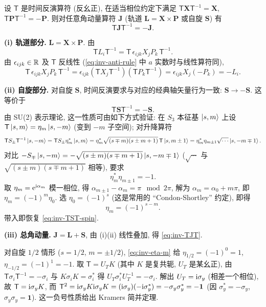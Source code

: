 \begin{proposition}\label{prop:inv-TST}
设 $\mathsf{T}$ 是时间反演算符 (反幺正), 在适当相位约定下满足 $\mathsf{T}\mathbf{X}\mathsf{T}^{-1}=\mathbf{X}$, $\mathsf{T}\mathbf{P}\mathsf{T}^{-1}=-\mathbf{P}$. 则对任意角动量算符 $\mathbf{J}$ (轨道 $\mathbf{L}=\mathbf{X}\times \mathbf{P}$ 或自旋 $\mathbf{S}$) 有
\begin{equation}\label{eq:inv-TJT}
\mathsf{T}\mathbf{J}\mathsf{T}^{-1}=-\mathbf{J}.
\end{equation}
\end{proposition}

\begin{proof*}
\textbf{(i) 轨道部分.}
$\mathbf{L}=\mathbf{X}\times\mathbf{P}$. 由
\[
\mathsf{T}L_i \mathsf{T}^{-1} = \mathsf{T}\,\epsilon_{ijk}X_j P_k\,\mathsf{T}^{-1}.
\]
由 $\epsilon_{ijk}\in\mathbb{R}$ 及 $\mathsf{T}$ 反线性 (\eqref{eq:inv-anti-rule} 中 $a$ 实数时与线性算符同),
\[
\mathsf{T}\,\epsilon_{ijk}X_j P_k\,\mathsf{T}^{-1}=\epsilon_{ijk}(\mathsf{T}X_j\mathsf{T}^{-1})(\mathsf{T}P_k\mathsf{T}^{-1})=\epsilon_{ijk}X_j(-P_k)=-L_i.
\]

\textbf{(ii) 自旋部分.}
对自旋 $\mathbf{S}$, 时间反演要求与对应的经典轴矢量行为一致: $\mathbf{S}\to -\mathbf{S}$. 这等价于
\begin{equation}\label{eq:inv-TST-spin}
\mathsf{T}\mathbf{S}\mathsf{T}^{-1}=-\mathbf{S}.
\end{equation}
由 SU(2) 表示理论, 这一性质可由如下方式验证: 在 $S_3$ 本征基 $\ket{s,m}$ 上设 $\mathsf{T}\ket{s,m}=\eta_m\ket{s,-m}$ (变到 $-m$ 子空间); 对升降算符
\[
\mathsf{T}S_\pm \mathsf{T}^{-1}\ket{s,-m}=\mathsf{T}S_\pm \eta_m^*\ket{s,m}=\eta_m^*\sqrt{(s\mp m)(s\pm m+1)}\,\mathsf{T}\ket{s,m\pm 1}=\eta_m^*\eta_{m\pm 1}\sqrt{\cdots}\ket{s,-m\mp 1}.
\]
对比 $-S_\mp\ket{s,-m}=-\sqrt{(s\pm m)(s\mp m+1)}\ket{s,-m\mp 1}$ ($\sqrt{\cdots}$ 与 $\sqrt{(s\pm m)(s\mp m+1)}$ 相等), 要求
\[
\eta_m^*\eta_{m\pm 1}=-1.
\]
取 $\eta_m=\mathrm{e}^{\mathrm{i} \alpha_m}$ 模一相位, 得 $\alpha_{m\pm 1}-\alpha_m=\pi \mod 2\pi$, 解为 $\alpha_m=\alpha_0+m\pi$, 即 $\eta_m=(-1)^m \eta_0$. 选 $\eta_0=(-1)^s$ (这是常用的 ``Condon-Shortley'' 约定), 即得
\begin{equation}\label{eq:inv-eta-m}
\eta_m=(-1)^{s-m}.
\end{equation}
带入即恢复 \eqref{eq:inv-TST-spin}.

\textbf{(iii) 总角动量.} $\mathbf{J}=\mathbf{L}+\mathbf{S}$, 由 (i)(ii) 线性叠加, 得 \eqref{eq:inv-TJT}.
\end{proof*}

\begin{remark}
对自旋 $1/2$ 情形 ($s=1/2$, $m=\pm 1/2$), \eqref{eq:inv-eta-m} 给 $\eta_{1/2}=(-1)^0=1$, $\eta_{-1/2}=(-1)^1=-1$. 取 $\mathsf{T}=U_T K$ (其中 $K$ 是复共轭, $U_T$ 是某幺正), 由 $\mathsf{T}\sigma_i\mathsf{T}^{-1}=-\sigma_i$ 与 $K\sigma_i K=\sigma_i^*$ 得 $U_T\sigma_i^* U_T^{-1}=-\sigma_i$. 解出 $U_T=\mathrm{i} \sigma_y$ (相差一个相位), 故 $\mathsf{T}=\mathrm{i} \sigma_y K$, 而 $\mathsf{T}^2=\mathrm{i}\sigma_y K\mathrm{i}\sigma_y K=(\mathrm{i}\sigma_y)(-\mathrm{i}\sigma_y^*)=-\sigma_y\sigma_y^* =-\mathbf{1}$ (因 $\sigma_y^*=-\sigma_y$, $\sigma_y\sigma_y=\mathbf{1}$). 这一负号性质给出 Kramers 简并定理.
\end{remark}


